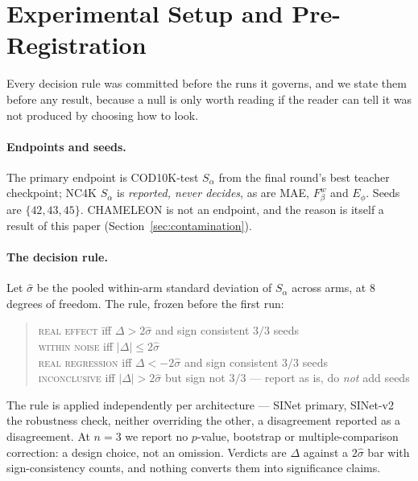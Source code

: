 \documentclass{article} %
\begin{document}
\section{Experimental Setup and Pre-Registration}
\label{sec:setup}

Every decision rule was committed before the runs it governs, and we state them before any result,
because a null is only worth reading if the reader can tell it was not produced by choosing how to
look.

\paragraph{Endpoints and seeds.} The primary endpoint is COD10K-test $S_\alpha$ from the final round's
best teacher checkpoint; NC4K $S_\alpha$ is \emph{reported, never decides}, as are MAE, $F_\beta^w$ and
$E_\phi$. Seeds are $\{42,43,45\}$. CHAMELEON is not an endpoint, and the reason is itself a result of
this paper (Section~\ref{sec:contamination}).

\paragraph{The decision rule.} Let $\hat{\sigma}$ be the pooled within-arm standard deviation of
$S_\alpha$ across arms, at $8$ degrees of freedom. The rule, frozen before the first run:
\begin{quote}
\begin{tabbing}
\textsc{real effect} \quad\= iff $\Delta > 2\hat{\sigma}$ \; and sign consistent $3/3$ seeds \\
\textsc{within noise} \> iff $|\Delta| \leq 2\hat{\sigma}$ \\
\textsc{real regression} \> iff $\Delta < -2\hat{\sigma}$ \; and sign consistent $3/3$ seeds \\
\textsc{inconclusive} \> iff $|\Delta| > 2\hat{\sigma}$ but sign not $3/3$ --- report as is, do
\emph{not} add seeds
\end{tabbing}
\end{quote}
The rule is applied independently per architecture --- SINet primary, SINet-v2 the robustness check,
neither overriding the other, a disagreement reported as a disagreement. At $n = 3$ we report no
$p$-value, bootstrap or multiple-comparison correction: a design choice, not an omission. Verdicts are
$\Delta$ against a $2\hat{\sigma}$ bar with sign-consistency counts, and nothing converts them into
significance claims.
\end{document}
